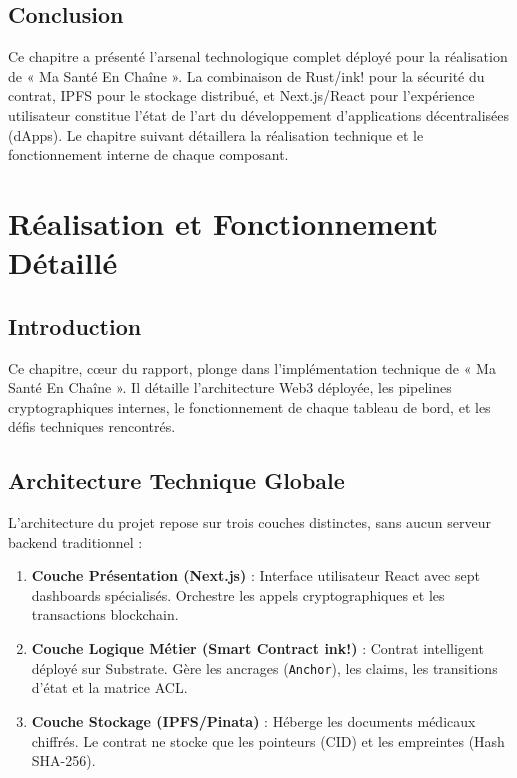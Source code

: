 \documentclass[12pt,a4paper]{report}
\begin{document}
\section{Conclusion}
Ce chapitre a présenté l'arsenal technologique complet déployé pour la réalisation de « Ma Santé En Chaîne ». La combinaison de Rust/ink! pour la sécurité du contrat, IPFS pour le stockage distribué, et Next.js/React pour l'expérience utilisateur constitue l'état de l'art du développement d'applications décentralisées (dApps). Le chapitre suivant détaillera la réalisation technique et le fonctionnement interne de chaque composant.

\chapter{Réalisation et Fonctionnement Détaillé}

\section{Introduction}
Ce chapitre, cœur du rapport, plonge dans l'implémentation technique de « Ma Santé En Chaîne ». Il détaille l'architecture Web3 déployée, les pipelines cryptographiques internes, le fonctionnement de chaque tableau de bord, et les défis techniques rencontrés.

\section{Architecture Technique Globale}
L'architecture du projet repose sur trois couches distinctes, sans aucun serveur backend traditionnel :

\begin{enumerate}
    \item \textbf{Couche Présentation (Next.js)} : Interface utilisateur React avec sept dashboards spécialisés. Orchestre les appels cryptographiques et les transactions blockchain.
    \item \textbf{Couche Logique Métier (Smart Contract ink!)} : Contrat intelligent déployé sur Substrate. Gère les ancrages (\texttt{Anchor}), les claims, les transitions d'état et la matrice ACL.
    \item \textbf{Couche Stockage (IPFS/Pinata)} : Héberge les documents médicaux chiffrés. Le contrat ne stocke que les pointeurs (CID) et les empreintes (Hash SHA-256).
\end{enumerate}
\end{document}
